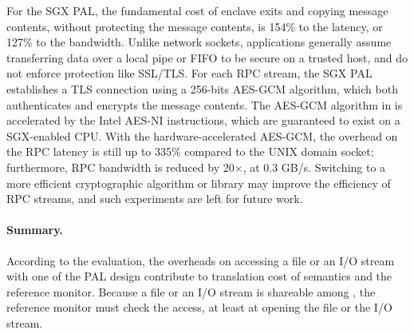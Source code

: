 For the SGX PAL,
the fundamental cost of enclave exits and copying message contents,
without protecting the message contents,
is \roughly{}154\% to the latency,
or \roughly{}127\% to the bandwidth.
Unlike network sockets, 
applications generally assume transferring data over a local pipe or FIFO to be secure on a trusted host, and do not enforce protection like SSL/TLS.
For each RPC stream, the SGX PAL establishes a TLS connection using a 256-bits AES-GCM algorithm, which both authenticates and encrypts the message contents.
The AES-GCM algorithm in \graphenesgx{} is accelerated by the Intel AES-NI instructions, which are guaranteed to exist on a SGX-enabled CPU.
With the hardware-accelerated AES-GCM,
the overhead on the RPC latency is still up to \roughly{}335\% compared to the UNIX domain socket;
furthermore, RPC bandwidth
is reduced by \roughly{}20$\times$, at \roughly{}0.3 GB/s.
Switching to a more efficient cryptographic algorithm or library may improve the efficiency of RPC streams,
and such experiments are left for future work.






\paragraph{Summary.}
According to the evaluation, the overheads on accessing a file or an I/O stream
with one of the PAL design
contribute to translation cost of \thehostabi{} semantics
and the reference monitor.
Because a file or an I/O stream
is shareable among \picoprocs{}, the reference monitor
must check the access, at least
at opening the file or the I/O stream.





